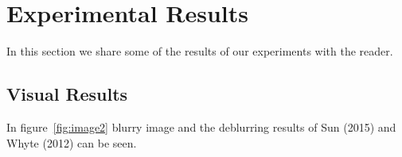 \documentclass[10pt,twocolumn,letterpaper]{article}
\begin{document}
\section{Experimental Results}

In this section we share some of the results of our experiments with the reader. 

\subsection{Visual Results}

In figure~\ref{fig:image2} blurry image and the deblurring results of Sun \etal (2015) and Whyte \etal (2012) can be seen.



\end{document}

